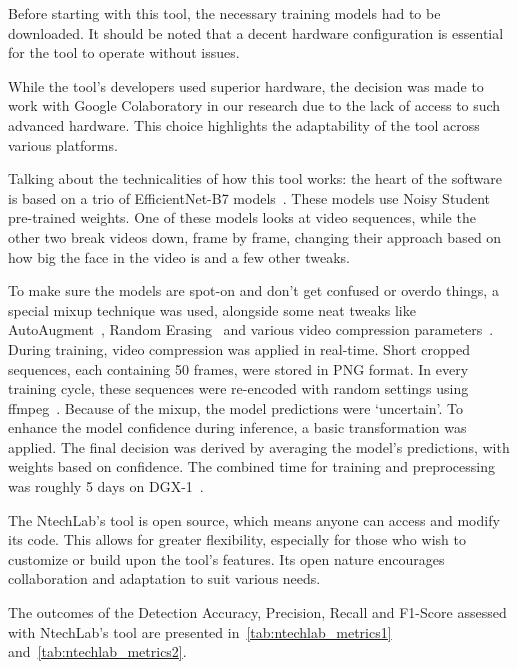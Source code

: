 Before starting with this tool, the necessary training models had to be downloaded.
It should be noted that a decent hardware configuration is essential for the tool
to operate without issues.

While the tool's developers used superior hardware, the decision was made
to work with Google Colaboratory in our research due to the lack of access to such
advanced hardware. This choice highlights the adaptability of the tool
across various platforms.

Talking about the technicalities of how this tool works: the heart of the software is
based on a trio of EfficientNet-B7 models~\cite{tan2020efficientnet}.
These models use Noisy Student~\cite{xie2020selftraining} pre-trained weights.
One of these models looks at video sequences, while the other two break videos
down, frame by frame, changing their approach based on how big the face in the
video is and a few other tweaks.

To make sure the models are spot-on and don't get confused or overdo things,
a special mixup technique was used, alongside some neat tweaks like
AutoAugment~\cite{cubuk2019autoaugment}, Random Erasing~\cite{zhong2017random}
and various video compression parameters~\cite{ntechlab-github}. During training,
video compression was applied in real-time. Short cropped sequences, each
containing 50 frames, were stored in PNG format. In every training cycle, these
sequences were re-encoded with random settings using ffmpeg~\cite{enwiki:1156808546}.
Because of the mixup, the model predictions were `uncertain'. To enhance the model
confidence during inference, a basic transformation was applied. The final
decision was derived by averaging the model's predictions, with weights
based on confidence. The combined time for training and preprocessing was
roughly 5 days on DGX-1~\cite{enwiki:1168440769}.

The NtechLab's tool is open source, which means anyone can access and modify its
code. This allows for greater flexibility, especially for those who wish to
customize or build upon the tool's features. Its open nature encourages
collaboration and adaptation to suit various needs.

The outcomes of the Detection Accuracy, Precision, Recall and F1-Score assessed
with NtechLab's tool are presented in~\autoref{tab:ntechlab_metrics1} and~\autoref{tab:ntechlab_metrics2}.

